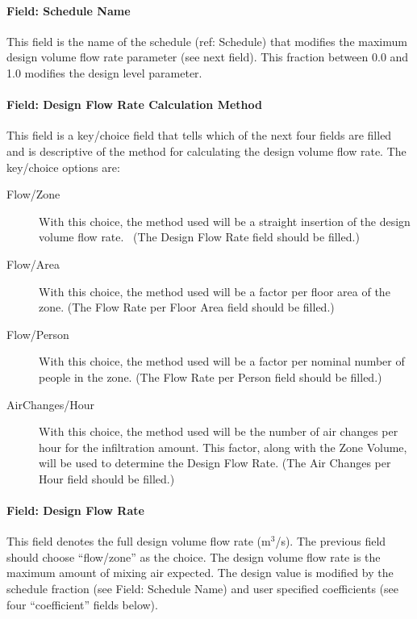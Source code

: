 \paragraph{Field: Schedule Name}\label{field-schedule-name-4}

This field is the name of the schedule (ref: Schedule) that modifies the maximum design volume flow rate parameter (see next field). This fraction between 0.0 and 1.0 modifies the design level parameter.

\paragraph{Field: Design Flow Rate Calculation Method}\label{field-design-flow-rate-calculation-method-3}

This field is a key/choice field that tells which of the next four fields are filled and is descriptive of the method for calculating the design volume flow rate. The key/choice options are:

\begin{description}

\item[Flow/Zone] With this choice, the method used will be a straight insertion of the design volume flow rate.~ (The Design Flow Rate field should be filled.)

\item[Flow/Area] With this choice, the method used will be a factor per floor area of the zone. (The Flow Rate per Floor Area field should be filled.)

\item[Flow/Person] With this choice, the method used will be a factor per nominal number of people in the zone. (The Flow Rate per Person field should be filled.)

\item[AirChanges/Hour] With this choice, the method used will be the number of air changes per hour for the infiltration amount. This factor, along with the Zone Volume, will be used to determine the Design Flow Rate. (The Air Changes per Hour field should be filled.)

\end{description}

\paragraph{Field: Design Flow Rate}\label{field-design-flow-rate-3}

This field denotes the full design volume flow rate (m\(^{3}\)/s). The previous field should choose ``flow/zone'' as the choice. The design volume flow rate is the maximum amount of mixing air expected. The design value is modified by the schedule fraction (see Field: Schedule Name) and user specified coefficients (see four ``coefficient'' fields below).

